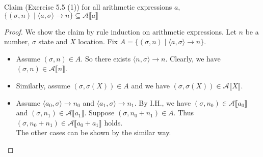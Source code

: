 \documentclass[12pt,aspectratio=169]{beamer}
\newcommand{\denoA}[1]{\mathcal{A} \llbracket #1 \rrbracket}
\newcommand{\deriv}[3]{\langle #1, #2 \rangle \rightarrow #3}
\begin{document}
\begin{frame}
    \begin{block}{Claim (Exercise 5.5 (1))}
        for all arithmetic expressions $a$, $\{(\sigma, n) \mid \langle a, \sigma \rangle \rightarrow n\} \subseteq \denoA{a}$
    \end{block}
    \begin{proof}
        We show the claim by rule induction on arithmetic expressions.
        Let $n$ be a number, $\sigma$ state and $X$ location.
        Fix $A = \{(\sigma, n) \mid \deriv{a}{\sigma}{n}\}$.
        \pause
        \begin{itemize}[<+->]
            \item Assume $(\sigma, n) \in A$. So there exists $\deriv{n}{\sigma}{n}$.
                Clearly, we have $(\sigma,n) \in \denoA{n}$. %
            \item Similarly, assume $(\sigma, \sigma(X)) \in A$ and we have $(\sigma, \sigma(X)) \in \denoA{X}$.%
            \item Assume $\deriv{a_0}{\sigma}{n_0}$ and $\deriv{a_1}{\sigma}{n_1}$.
                By I.H., we have $(\sigma, n_0) \in \denoA{a_0}$ and $(\sigma,n_1) \in \denoA{a_1}$.
                Suppose $(\sigma, n_0 + n_1) \in A$. %
                Thus $(\sigma, n_0 + n_1) \in \denoA{a_0 + a_1} $ holds.\\
                The other cases can be shown by the similar way.
        \end{itemize}
    \end{proof}
\end{frame}
\end{document}

